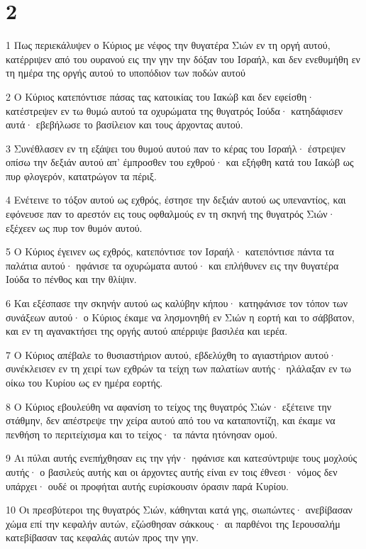 \chapter{2}

\par 1 Πως περιεκάλυψεν ο Κύριος με νέφος την θυγατέρα Σιών εν τη οργή αυτού, κατέρριψεν από του ουρανού εις την γην την δόξαν του Ισραήλ, και δεν ενεθυμήθη εν τη ημέρα της οργής αυτού το υποπόδιον των ποδών αυτού
\par 2 Ο Κύριος κατεπόντισε πάσας τας κατοικίας του Ιακώβ και δεν εφείσθη· κατέστρεψεν εν τω θυμώ αυτού τα οχυρώματα της θυγατρός Ιούδα· κατηδάφισεν αυτά· εβεβήλωσε το βασίλειον και τους άρχοντας αυτού.
\par 3 Συνέθλασεν εν τη εξάψει του θυμού αυτού παν το κέρας του Ισραήλ· έστρεψεν οπίσω την δεξιάν αυτού απ' έμπροσθεν του εχθρού· και εξήφθη κατά του Ιακώβ ως πυρ φλογερόν, κατατρώγον τα πέριξ.
\par 4 Ενέτεινε το τόξον αυτού ως εχθρός, έστησε την δεξιάν αυτού ως υπεναντίος, και εφόνευσε παν το αρεστόν εις τους οφθαλμούς εν τη σκηνή της θυγατρός Σιών· εξέχεεν ως πυρ τον θυμόν αυτού.
\par 5 Ο Κύριος έγεινεν ως εχθρός, κατεπόντισε τον Ισραήλ· κατεπόντισε πάντα τα παλάτια αυτού· ηφάνισε τα οχυρώματα αυτού· και επλήθυνεν εις την θυγατέρα Ιούδα το πένθος και την θλίψιν.
\par 6 Και εξέσπασε την σκηνήν αυτού ως καλύβην κήπου· κατηφάνισε τον τόπον των συνάξεων αυτού· ο Κύριος έκαμε να λησμονηθή εν Σιών η εορτή και το σάββατον, και εν τη αγανακτήσει της οργής αυτού απέρριψε βασιλέα και ιερέα.
\par 7 Ο Κύριος απέβαλε το θυσιαστήριον αυτού, εβδελύχθη το αγιαστήριον αυτού· συνέκλεισεν εν τη χειρί των εχθρών τα τείχη των παλατίων αυτής· ηλάλαξαν εν τω οίκω του Κυρίου ως εν ημέρα εορτής.
\par 8 Ο Κύριος εβουλεύθη να αφανίση το τείχος της θυγατρός Σιών· εξέτεινε την στάθμην, δεν απέστρεψε την χείρα αυτού από του να καταποντίζη, και έκαμε να πενθήση το περιτείχισμα και το τείχος· τα πάντα ητόνησαν ομού.
\par 9 Αι πύλαι αυτής ενεπήχθησαν εις την γήν· ηφάνισε και κατεσύντριψε τους μοχλούς αυτής· ο βασιλεύς αυτής και οι άρχοντες αυτής είναι εν τοις έθνεσι· νόμος δεν υπάρχει· ουδέ οι προφήται αυτής ευρίσκουσιν όρασιν παρά Κυρίου.
\par 10 Οι πρεσβύτεροι της θυγατρός Σιών, κάθηνται κατά γης, σιωπώντες· ανεβίβασαν χώμα επί την κεφαλήν αυτών, εζώσθησαν σάκκους· αι παρθένοι της Ιερουσαλήμ κατεβίβασαν τας κεφαλάς αυτών προς την γην.
